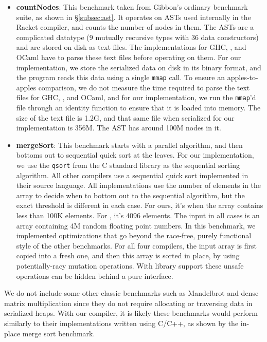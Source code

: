 \documentclass[showabstract,showacknowledgments,showpreface,showdedication,school]{iuphd}
\theoremstyle{nonumberplain}
\newcommand{\MPL}{\text{MaPLe}}
\newcommand{\secref}[1]{\S\ref{#1}}
\newcommand{\il}[1]{\lstinline[style=inline,mathescape=true];#1;}
\begin{document}
\begin{itemize}
\item \textbf{countNodes}:
  This benchmark taken from Gibbon's ordinary benchmark suite, as shown in \secref{subsec:ast}.
  It operates on ASTs used internally in the Racket compiler, and counts the number
  of nodes in them.
  The ASTs are a complicated datatype (9 mutually recursive types with 36
  data constructors) and are stored on disk as text files.
  The implementations for GHC, \MPL, and OCaml have to parse these text files before
  operating on them.
  For our implementation, we store the serialized data on disk in its
  binary format, and the program reads this data using a single \il{mmap} call.
  To ensure an apples-to-apples comparison, we do not measure the time required
  to parse the text files for GHC, \MPL{}, and OCaml, and for our implementation,
  we run the \il{mmap}'d file through an identity function to ensure that it
  is loaded into memory.
  The size of the text file is 1.2G, and that same file
  when serialized for our implementation is 356M.
  The AST has around 100M nodes in it.

\item \textbf{mergeSort}:
  This benchmark starts with a parallel algorithm, and then bottoms out to sequential
  quick sort at the leaves.
  For our implementation, we use the \il{qsort} from the C standard library as
  the sequential sorting algorithm.
  All other compilers use a sequential quick sort implemented in their source language.
  All implementations use the number of elements in the array to decide when to
  bottom out to the sequential algorithm, but the exact threshold is different in each case.
  For ours, it's when the array contains less than 100K elements.
  For \MPL{}, it's 4096 elements.
  The input in all cases is an array containing 4M random floating point numbers.
  In this benchmark, we implemented optimizations that go beyond the
  race-free, purely functional style of the other benchmarks.
  For all four compilers, the input array is first copied into a fresh one,
  and then this array is sorted in place, by using potentially-racy mutation operations.
  With library support these unsafe operations can be hidden behind a pure interface.




\end{itemize}

We do not include some other classic benchmarks such as Mandelbrot and dense matrix
multiplication since they do not require allocating or traversing data in
serialized heaps.
With our compiler, it is likely these benchmarks would perform similarly to
their implementations written using C/C++, as shown by the in-place merge sort
benchmark.
\end{document}
